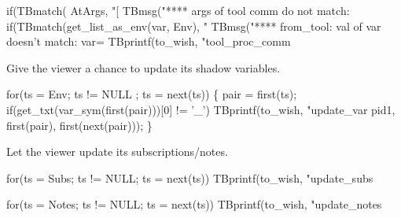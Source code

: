 \nwenddocs{}\endmoddef\nwstartdeflinemarkup{}\nwenddeflinemarkup
  if(TBmatch( AtArgs, "[%
    TBmsg("**** args of tool comm do not match:%
  if(TBmatch(get_list_as_env(var, Env), "%
    TBmsg("**** from_tool: val of var doesn't match: var=%
  TBprintf(to_wish, "tool_proc_comm %
\nwendcode{}\nwdocspar


Give the viewer a chance to update its shadow variables.

\nwenddocs{}\endmoddef\nwstartdeflinemarkup{}\nwenddeflinemarkup
  for(ts = Env; ts != NULL ; ts = next(ts)) \{
    pair = first(ts);
    if(get_txt(var_sym(first(pair)))[0] != '_')
    TBprintf(to_wish, "update_var %
                                pid1, first(pair), first(next(pair)));
  \}
\nwendcode{}\nwdocspar


Let the viewer update its subscriptions/notes.

\nwenddocs{}\endmoddef\nwstartdeflinemarkup{}\nwenddeflinemarkup
  for(ts = Subs; ts != NULL; ts = next(ts))
    TBprintf(to_wish, "update_subs %
\nwendcode{}\nwdocspar

\nwenddocs{}\endmoddef\nwstartdeflinemarkup{}\nwenddeflinemarkup
  for(ts = Notes; ts != NULL; ts = next(ts))
    TBprintf(to_wish, "update_notes %
\nwendcode{}\nwdocspar

